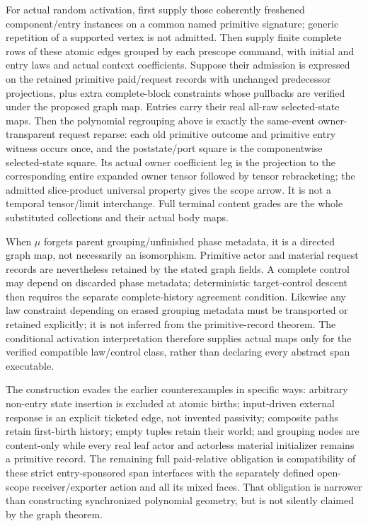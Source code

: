 \documentclass[11pt]{article}
\begin{document}
For actual random activation, first supply those coherently freshened component/entry instances on a common named primitive signature; generic repetition of a supported vertex is not admitted. Then supply finite complete rows of these atomic edges grouped by each prescope command, with initial and entry laws and actual context coefficients. Suppose their admission is expressed on the retained primitive paid/request records with unchanged predecessor projections, plus extra complete-block constraints whose pullbacks are verified under the proposed graph map. Entries carry their real all-raw selected-state maps. Then the polynomial regrouping above is exactly the same-event owner-transparent request reparse: each old primitive outcome and primitive entry witness occurs once, and the poststate/port square is the componentwise selected-state square. Its actual owner coefficient leg is the projection to the corresponding entire expanded owner tensor followed by tensor rebracketing; the admitted slice-product universal property gives the scope arrow. It is not a temporal tensor/limit interchange. Full terminal content grades are the whole substituted collections and their actual body maps.

When $\mu$ forgets parent grouping/unfinished phase metadata, it is a directed graph map, not necessarily an isomorphism. Primitive actor and material request records are nevertheless retained by the stated graph fields. A complete control may depend on discarded phase metadata; deterministic target-control descent then requires the separate complete-history agreement condition. Likewise any law constraint depending on erased grouping metadata must be transported or retained explicitly; it is not inferred from the primitive-record theorem. The conditional activation interpretation therefore supplies actual maps only for the verified compatible law/control class, rather than declaring every abstract span executable.

The construction evades the earlier counterexamples in specific ways: arbitrary non-entry state insertion is excluded at atomic births; input-driven external response is an explicit ticketed edge, not invented passivity; composite paths retain first-birth history; empty tuples retain their world; and grouping nodes are content-only while every real leaf actor and actorless material initializer remains a primitive record. The remaining full paid-relative obligation is compatibility of these strict entry-sponsored span interfaces with the separately defined open-scope receiver/exporter action and all its mixed faces. That obligation is narrower than constructing synchronized polynomial geometry, but is not silently claimed by the graph theorem.
\end{document}
